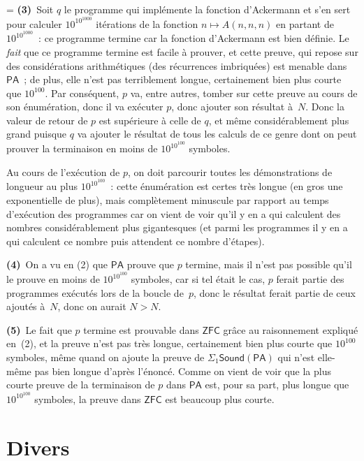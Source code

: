 \documentclass[12pt,a4paper]{article}
\theoremstyle{definition}
\newif\ifcorrige
\newenvironment{corrige}%
{\ifcorrige\relax\else\setbox0=\vbox\bgroup\fi%
\smallbreak\footnotesize\noindent{\underbar{\textit{Corrigé.}}\quad}}
{{\hbox{}\nobreak\hfill\checkmark}%
\ifcorrige\relax\else\egroup\fi\par}
\begin{document}
\begin{corrige}
\textbf{(3)} Soit $q$ le programme qui implémente la fonction
d'Ackermann et s'en sert pour calculer $10^{10^{1000}}$ itérations de
la fonction $n \mapsto A(n,n,n)$ en partant de $10^{10^{1000}}$ : ce
programme termine car la fonction d'Ackermann est bien définie.  Le
\emph{fait} que ce programme termine est facile à prouver, et cette
preuve, qui repose sur des considérations arithmétiques (des
récurrences imbriquées) est menable dans $\mathsf{PA}$ ; de plus, elle
n'est pas terriblement longue, certainement bien plus courte que
$10^{100}$.  Par conséquent, $p$ va, entre autres, tomber sur cette
preuve au cours de son énumération, donc il va exécuter $p$, donc
ajouter son résultat à $N$.  Donc la valeur de retour de $p$ est
supérieure à celle de $q$, et même considérablement plus grand puisque
$q$ va ajouter le résultat de tous les calculs de ce genre dont on
peut prouver la terminaison en moins de $10^{10^{100}}$ symboles.

Au cours de l'exécution de $p$, on doit parcourir toutes les
démonstrations de longueur au plus $10^{10^{100}}$ : cette énumération
est certes très longue (en gros une exponentielle de plus), mais
complètement minuscule par rapport au temps d'exécution des programmes
car on vient de voir qu'il y en a qui calculent des nombres
considérablement plus gigantesques (et parmi les programmes il y en a
qui calculent ce nombre puis attendent ce nombre d'étapes).

\textbf{(4)} On a vu en (2) que $\mathsf{PA}$ prouve que $p$ termine,
mais il n'est pas possible qu'il le prouve en moins de $10^{10^{100}}$
symboles, car si tel était le cas, $p$ ferait partie des programmes
exécutés lors de la boucle de $p$, donc le résultat ferait partie de
ceux ajoutés à $N$, donc on aurait $N>N$.

\textbf{(5)} Le fait que $p$ termine est prouvable dans $\mathsf{ZFC}$
grâce au raisonnement expliqué en (2), et la preuve n'est pas très
longue, certainement bien plus courte que $10^{100}$ symboles, même
quand on ajoute la preuve de $\Sigma_1\mathsf{Sound}(\mathsf{PA})$ qui
n'est elle-même pas bien longue d'après l'énoncé.  Comme on vient de
voir que la plus courte preuve de la terminaison de $p$ dans
$\mathsf{PA}$ est, pour sa part, plus longue que $10^{10^{100}}$
symboles, la preuve dans $\mathsf{ZFC}$ est beaucoup plus courte.
\end{corrige}


%
%
%

\section{Divers}
\end{document}
